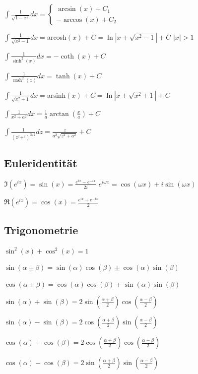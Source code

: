 \documentclass[10pt,a4paper]{scrartcl}
\begin{document}
\begin{multicols*}{3}
	\finn
	
	$\int{\frac{1}{\sqrt{1-x^2}}dx}=
	\begin{cases}
	\arcsin(x)+C_1\\
	-\arccos(x)+C_2
	\end{cases}	
	$
	
	$\int{\frac{1}{\sqrt{x^2-1}}dx}=$arcosh$(x)+C=\ln|x+\sqrt{x^2-1}|+C$ \hfill $|x|>1$
	
	\finn
	
	$\int{\frac{1}{\sinh^2(x)}dx}=-\coth(x)+C$	
	
	$\int{\frac{1}{\cosh^2(x)}dx}=\tanh(x)+C$
	
	\finn
	
	$\int{\frac{1}{\sqrt{x^2+1}}dx}=$arsinh$(x)+C=\ln|x+\sqrt{x^2+1}|+C$
		
	$\int{\frac{1}{x^2+a^2}dx}=\frac{1}{a}\arctan(\frac{x}{a})+C$
	
	\finn
	
	$\int{\frac{1}{\left(z^2+^2\right)^{3/2}}dz}=\frac{z}{a^2\sqrt{z^2+a^2}}+C$
	
	\subsection*{Euleridentität}
	$\Im(e^{ix})=\sin(x)=\frac{e^{ix}-e^{-ix}}{2i}$ \hfill $e^{i\omega x}=\cos(\omega x)+i\sin(\omega x)$
	
	$\Re(e^{ix})=\cos(x)=\frac{e^{ix}+e^{-ix}}{2}$
	
	\columnbreak	
	
	\subsection*{Trigonometrie}
	
	$\sin^2(x)+\cos^2(x)=1$	

	\finn
	
	$\sin(\alpha \pm \beta)=\sin(\alpha)\cos(\beta)\pm \cos(\alpha)\sin(\beta)$
	
	$\cos(\alpha \pm \beta)=\cos(\alpha)\cos(\beta)\mp \sin(\alpha)\sin(\beta)$
	
	\finn	
	
	$\sin(\alpha)+\sin(\beta) = 2\sin(\frac{\alpha+\beta}{2})\cos(\frac{\alpha-\beta}{2})$
	
	$\sin(\alpha)-\sin(\beta)=2\cos(\frac{\alpha+\beta}{2})\sin(\frac{\alpha-\beta}{2})$
	
	$\cos(\alpha)+\cos(\beta)=2\cos(\frac{\alpha+\beta}{2})\cos(\frac{\alpha-\beta}{2})$
	
	$\cos(\alpha)-\cos(\beta)=2\sin(\frac{\alpha+\beta}{2})\sin(\frac{\alpha-\beta}{2})$
	

\end{multicols*}
\end{document}
